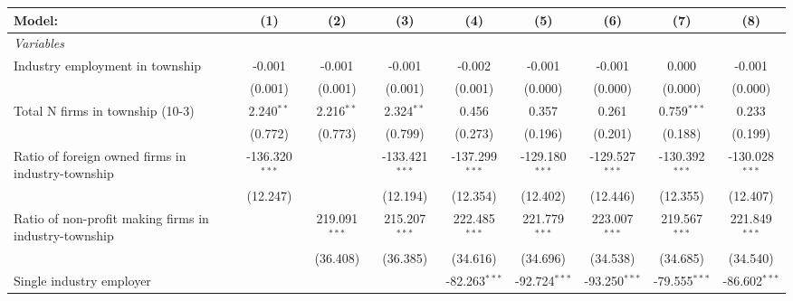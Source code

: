 \begingroup
\centering
\begin{tabular}{lcccccccc}
   \tabularnewline \midrule \midrule
   Model:                                                & (1)              & (2)             & (3)              & (4)              & (5)              & (6)              & (7)              & (8)\\  
   \midrule
   \emph{Variables}\\
   Industry employment in township                       & -0.001           & -0.001          & -0.001           & -0.002           & -0.001           & -0.001           & 0.000            & -0.001\\   
                                                         & (0.001)          & (0.001)         & (0.001)          & (0.001)          & (0.000)          & (0.000)          & (0.000)          & (0.000)\\   
   Total N firms in township (10-3)                      & 2.240$^{**}$     & 2.216$^{**}$    & 2.324$^{**}$     & 0.456            & 0.357            & 0.261            & 0.759$^{***}$    & 0.233\\   
                                                         & (0.772)          & (0.773)         & (0.799)          & (0.273)          & (0.196)          & (0.201)          & (0.188)          & (0.199)\\   
   Ratio of foreign owned firms in industry-township     & -136.320$^{***}$ &                 & -133.421$^{***}$ & -137.299$^{***}$ & -129.180$^{***}$ & -129.527$^{***}$ & -130.392$^{***}$ & -130.028$^{***}$\\   
                                                         & (12.247)         &                 & (12.194)         & (12.354)         & (12.402)         & (12.446)         & (12.355)         & (12.407)\\   
   Ratio of non-profit making firms in industry-township &                  & 219.091$^{***}$ & 215.207$^{***}$  & 222.485$^{***}$  & 221.779$^{***}$  & 223.007$^{***}$  & 219.567$^{***}$  & 221.849$^{***}$\\   
                                                         &                  & (36.408)        & (36.385)         & (34.616)         & (34.696)         & (34.538)         & (34.685)         & (34.540)\\   
   Single industry employer                              &                  &                 &                  & -82.263$^{***}$  & -92.724$^{***}$  & -93.250$^{***}$  & -79.555$^{***}$  & -86.602$^{***}$\\   

\end{tabular}
